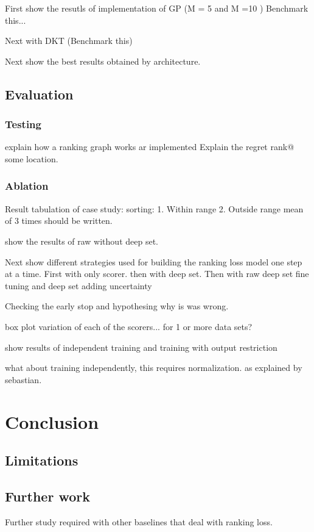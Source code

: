 \documentclass[11pt]{report}
\begin{document}
First show the resutls of implementation of GP (M = 5 and M =10 )
Benchmark this...

Next with DKT (Benchmark this)

Next show the best results obtained by architecture.

\section{Evaluation}
\subsection{Testing}
explain how a ranking graph works ar implemented
Explain the regret rank@ some location.

\subsection{Ablation}

Result tabulation of case study: sorting:
1.  Within range
2.   Outside range 
mean of 3 times should be written.

show the results of raw without deep set.

Next show different strategies used for building the ranking loss model one step at a time.
First with only scorer.
then with deep set.
Then with raw deep set
fine tuning and deep set
adding uncertainty

Checking the early stop and hypothesing why is was wrong.

box plot variation of each of the scorers... for 1 or more data sets?

show results of independent training and training with output restriction

what about training independently,   this requires normalization. 
as explained by sebastian.

\chapter{Conclusion}

\section{Limitations}

\section{Further work}
Further study required with other baselines that deal with ranking loss.
\end{document}
